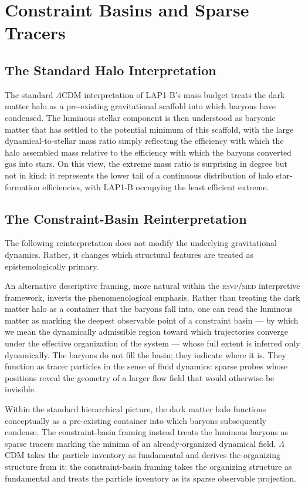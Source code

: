\documentclass[12pt, a4paper]{article}
\newcommand{\RSVP}{\textsc{rsvp}}
\newcommand{\SIED}{\textsc{sied}}
\theoremstyle{definition}
\begin{document}
\section{Constraint Basins and Sparse Tracers}
\label{sec:constraint}

\subsection{The Standard Halo Interpretation}

The standard $\Lambda$CDM interpretation of LAP1-B's mass budget treats the
dark matter halo as a pre-existing gravitational scaffold into which baryons
have condensed. The luminous stellar component is then understood as baryonic
matter that has settled to the potential minimum of this scaffold, with the
large dynamical-to-stellar mass ratio simply reflecting the efficiency with
which the halo assembled mass relative to the efficiency with which the
baryons converted gas into stars. On this view, the extreme mass ratio is
surprising in degree but not in kind: it represents the lower tail of a
continuous distribution of halo star-formation efficiencies, with LAP1-B
occupying the least efficient extreme.

\subsection{The Constraint-Basin Reinterpretation}

The following reinterpretation does not modify the underlying gravitational
dynamics. Rather, it changes which structural features are treated as
epistemologically primary.

An alternative descriptive framing, more natural within the \RSVP{}/\SIED{}
interpretive framework, inverts the phenomenological emphasis. Rather than
treating the dark matter halo as a container that the baryons fall into, one
can read the luminous matter as marking the deepest observable point of a
constraint basin --- by which we mean the dynamically admissible region toward
which trajectories converge under the effective organization of the system ---
whose full extent is inferred only dynamically. The baryons do not fill the
basin; they indicate where it is. They function as tracer particles in the
sense of fluid dynamics: sparse probes whose positions reveal the geometry of
a larger flow field that would otherwise be invisible.

Within the standard hierarchical picture, the dark matter halo functions
conceptually as a pre-existing container into which baryons subsequently
condense. The constraint-basin framing instead treats the luminous baryons
as sparse tracers marking the minima of an already-organized dynamical field.
$\Lambda$CDM takes the particle inventory as fundamental and derives the
organizing structure from it; the constraint-basin framing takes the
organizing structure as fundamental and treats the particle inventory as its
sparse observable projection.
\end{document}
